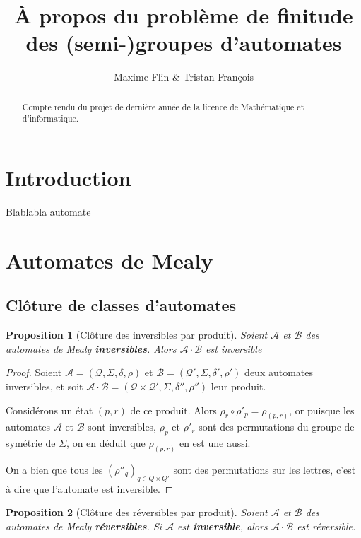 \documentclass{article}
\title{À propos du problème de finitude des (semi-)groupes d'automates}
\author{Maxime Flin \& Tristan François}
\newtheorem{prop}{Proposition}
\begin{document}
\maketitle

\begin{abstract}
  Compte rendu du projet de dernière année de la licence de Mathématique et d'informatique.
\end{abstract}


\section*{Introduction}
Blablabla automate

\section{Automates de Mealy}

\subsection{Clôture de classes d'automates}
\begin{prop}[Clôture des inversibles par produit]
  Soient $\mathcal{A}$ et $\mathcal{B}$ des automates de Mealy \textbf{inversibles}. Alors $\mathcal{A}\cdot\mathcal{B}$ est inversible
\end{prop}

\begin{proof}
  Soient $\mathcal{A}=\left(\mathcal{Q}, \Sigma, \delta, \rho\right)$ et $\mathcal{B}=\left(\mathcal{Q'}, \Sigma, \delta', \rho'\right)$ deux automates inversibles, et soit $\mathcal{A\cdot B}=\left(\mathcal{Q\times Q'}, \Sigma, \delta'', \rho''\right)$ leur produit.


  Considérons un état $(p, r)$ de ce produit. Alors $\rho_r\circ\rho'_p=\rho_{(p,r)}$, or puisque les automates $\mathcal{A}$ et $\mathcal{B}$ sont inversibles, $\rho_p$ et $\rho'_r$ sont des permutations du groupe de symétrie de $\Sigma$, on en déduit que $\rho_{(p, r)}$ en est une aussi.


  On a bien que tous les ${(\rho''_q)}_{q\in Q\times Q'}$ sont des permutations sur les lettres, c'est à dire que l'automate est inversible.
\end{proof}

\begin{prop}[Clôture des réversibles par produit]
  Soient $\mathcal{A}$ et $\mathcal{B}$ des automates de Mealy \textbf{réversibles}. Si $\mathcal{A}$ est \textbf{inversible}, alors $\mathcal{A}\cdot\mathcal{B}$ est réversible.
\end{prop}
\end{document}
